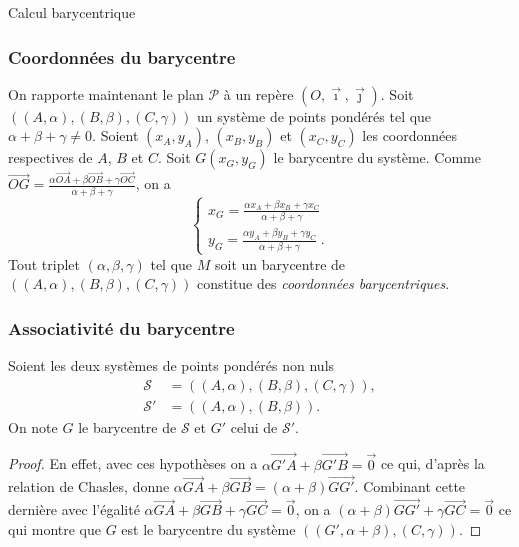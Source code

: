 \begin{chapter}{Calcul barycentrique}
\subsubsection{Coordonn\'ees du barycentre}
On rapporte maintenant le plan $\mathcal{P}$ \`a un rep\`ere $(O,\vec{\imath},\vec{\jmath})$.
Soit $((A,\alpha),(B,\beta),(C,\gamma))$ un syst\`eme de points pond\'er\'es tel que $\alpha + \beta + \gamma \neq 0$.
Soient $(x_A , y_A)$, $(x_B , y_B)$ et $(x_C , y_C)$ les coordonn\'ees respectives de $A$, $B$ et $C$.
Soit $G (x_G , y_G)$ le barycentre du syst\`eme.
Comme $\overrightarrow{OG} = \frac{\alpha \overrightarrow{OA} + \beta \overrightarrow{OB} + \gamma \overrightarrow{OC}}{\alpha + \beta + \gamma}$, on a 
\[
\left\lbrace
\begin{matrix}
x_G = \frac{\alpha x_A + \beta x_B + \gamma x_C }{\alpha + \beta + \gamma} \\
y_G = \frac{\alpha y_A + \beta y_B + \gamma y_C }{\alpha + \beta + \gamma} \; .
\end{matrix}
\right.
\]
Tout triplet $(\alpha , \beta , \gamma)$ tel que $M$ soit un barycentre de $((A,\alpha),(B,\beta),(C,\gamma))$ constitue des \emph{coordonn\'ees barycentriques}.
%
\subsubsection{Associativit\'e du barycentre}
Soient les deux syst\`emes de points pond\'er\'es non nuls
\[
  \begin{aligned}
    \mathcal{S}  &= ((A,\alpha),(B,\beta),(C,\gamma)), \\
    \mathcal{S}' &= ((A,\alpha),(B,\beta)).
  \end{aligned}
\]
On note $G$ le barycentre de $\mathcal{S}$ et $G'$ celui de $\mathcal{S}'$.
\par\noindent
{}
%
\begin{proof}
En effet, avec ces hypoth\`eses on a $\alpha \overrightarrow{G' A} + \beta \overrightarrow{G' B} = \vec{0}$ ce qui, d'apr\`es la relation de Chasles, donne 
$\alpha \overrightarrow{GA} + \beta \overrightarrow{GB} = (\alpha + \beta) \overrightarrow{GG'}$.
Combinant cette derni\`ere avec l'\'egalit\'e $\alpha \overrightarrow{GA} + \beta \overrightarrow{GB} + \gamma \overrightarrow{GC} = \vec{0}$, on a 
$(\alpha + \beta) \overrightarrow{GG'} + \gamma \overrightarrow{GC} = \vec{0}$ ce qui montre que $G$ est le barycentre du syst\`eme $((G' , \alpha + \beta),(C , \gamma))$.
\end{proof}
%

\end{chapter}
